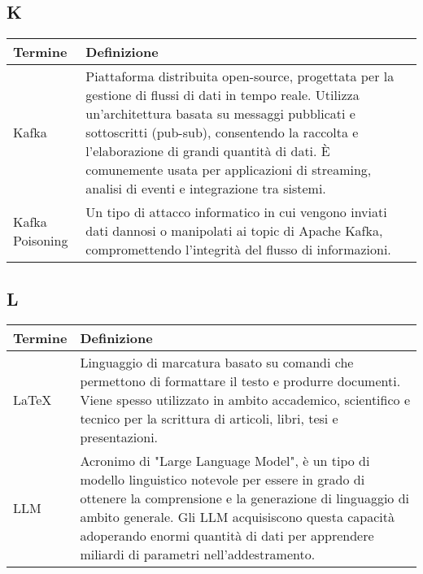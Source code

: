 \documentclass[10pt]{article}
\begin{document}
\subsection{K} %
\begin{longtable}{|>{\centering\arraybackslash}m{2.5cm}|>{\arraybackslash}m{12.5cm}|}
\hline
\rowcolor[gray]{0.8}
\textbf{Termine} & \textbf{Definizione}\\
\endhead
\hline
Kafka & Piattaforma distribuita open-source, progettata per la gestione di flussi di dati in tempo reale. Utilizza un'architettura basata su messaggi pubblicati e sottoscritti (pub-sub), consentendo la raccolta e l'elaborazione di grandi quantità di dati. È comunemente usata per applicazioni di streaming, analisi di eventi e integrazione tra sistemi.\\
\hline
Kafka Poisoning & Un tipo di attacco informatico in cui vengono inviati dati dannosi o manipolati ai topic di Apache Kafka, compromettendo l'integrità del flusso di informazioni.\\
\hline
\end{longtable}

\subsection{L} %
\begin{longtable}{|>{\centering\arraybackslash}m{2.5cm}|>{\arraybackslash}m{12.5cm}|}
\hline
\rowcolor[gray]{0.8}
\textbf{Termine} & \textbf{Definizione}\\
\endhead
\hline
\LaTeX & Linguaggio di marcatura basato su comandi che permettono di formattare il testo e produrre documenti. Viene spesso utilizzato in ambito accademico, scientifico e tecnico per la scrittura di articoli, libri, tesi e presentazioni.\\
\hline
LLM & Acronimo di "Large Language Model", è un tipo di modello linguistico notevole per essere in grado di ottenere la comprensione e la generazione di linguaggio di ambito generale. Gli LLM acquisiscono questa capacità adoperando enormi quantità di dati per apprendere miliardi di parametri nell'addestramento.\\
\hline
\end{longtable}
\end{document}
